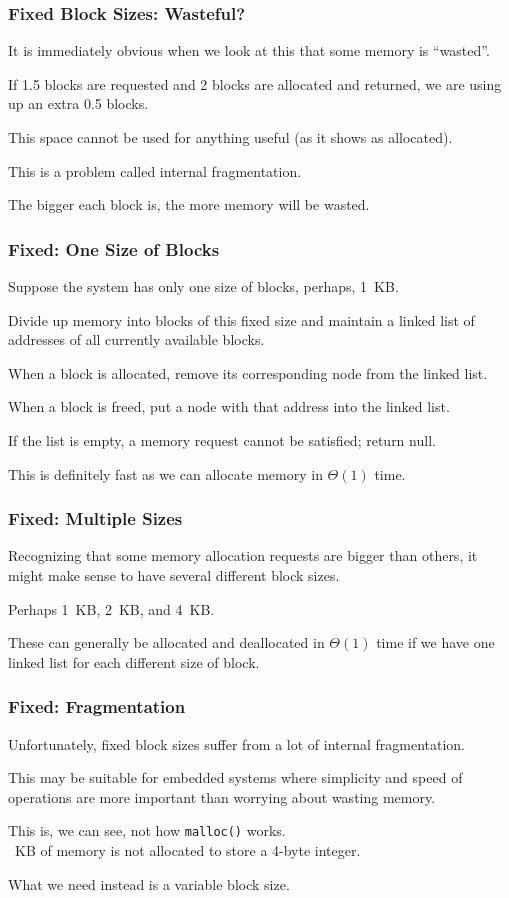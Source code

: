 \begin{frame}
\frametitle{Fixed Block Sizes: Wasteful?}

It is immediately obvious when we look at this that some memory is ``wasted''. 

If 1.5 blocks are requested and 2 blocks are allocated and returned, we are using up an extra 0.5 blocks. 

This space cannot be used for anything useful (as it shows as allocated). 

This is a problem called \alert{internal fragmentation}.

The bigger each block is, the more memory will be wasted.


\end{frame}

\begin{frame}
\frametitle{Fixed: One Size of Blocks}

Suppose the system has only one size of blocks, perhaps, 1~KB. 

Divide up memory into blocks of this fixed size and maintain a linked list of addresses of all currently available blocks. 

When a block is allocated, remove its corresponding node from the linked list. 

When a block is freed, put a node with that address into the linked list. 

If the list is empty, a memory request cannot be satisfied; return null.

This is definitely fast as we can allocate memory in $\Theta(1)$ time.


\end{frame}

\begin{frame}
\frametitle{Fixed: Multiple Sizes}

Recognizing that some memory allocation requests are bigger than others, it might make sense to have several different block sizes.

Perhaps 1~KB, 2~KB, and 4~KB. 

These can generally be allocated and deallocated in $\Theta(1)$ time if we have one linked list for each different size of block.


\end{frame}



\begin{frame}
\frametitle{Fixed: Fragmentation}

Unfortunately, fixed block sizes suffer from a lot of internal fragmentation. 

This may be suitable for embedded systems where simplicity and speed of operations are more important than worrying about wasting memory. 

This is, we can see, not how \texttt{malloc()} works.\\
~KB of memory is not allocated to store a 4-byte integer. 
 
What we need instead is a variable block size.


\end{frame}

